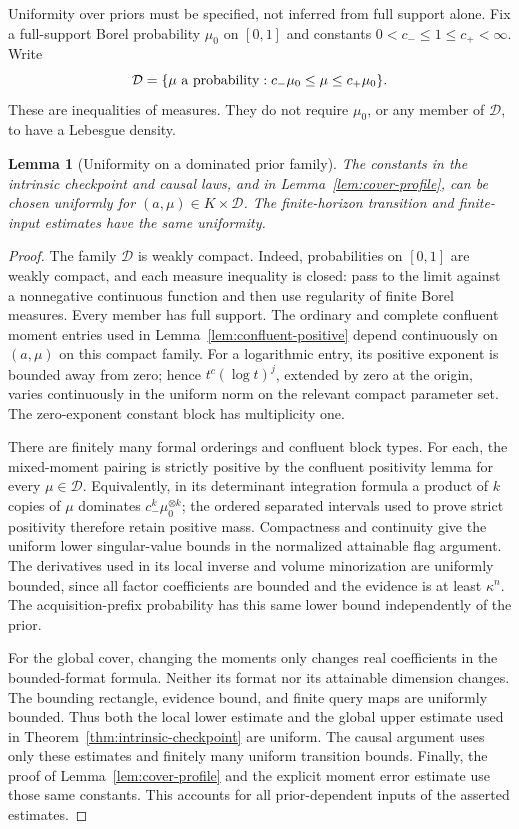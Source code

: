 \documentclass[11pt]{amsart}
\newtheorem{lemma}[theorem]{Lemma}
\theoremstyle{definition}\newtheorem{definition}[theorem]{Definition}
\theoremstyle{remark}\newtheorem{remark}[theorem]{Remark}
\begin{document}
Uniformity over priors must be specified, not inferred from full support
alone. Fix a full-support Borel probability $\mu_0$ on $[0,1]$ and
constants $0<c_-\le1\le c_+<\infty$. Write
\[
 \mathcal D=\{\mu\hbox{ a probability}:c_-\mu_0\le\mu\le c_+\mu_0\}.
\]
These are inequalities of measures. They do not require $\mu_0$, or
any member of $\mathcal D$, to have a Lebesgue density.

\begin{lemma}[Uniformity on a dominated prior family]
\label{lem:prior-envelope}
The constants in the intrinsic checkpoint and causal laws, and in
Lemma~\ref{lem:cover-profile}, can be chosen uniformly for
$(a,\mu)\in K\times\mathcal D$. The finite-horizon transition and
finite-input estimates have the same uniformity.
\end{lemma}
\begin{proof}
The family $\mathcal D$ is weakly compact. Indeed, probabilities on
$[0,1]$ are weakly compact, and each measure inequality is closed:
pass to the limit against a nonnegative continuous function and then
use regularity of finite Borel measures. Every member has full support.
The ordinary and complete confluent moment entries used in
Lemma~\ref{lem:confluent-positive} depend continuously on
$(a,\mu)$ on this compact family. For a logarithmic entry, its positive
exponent is bounded away from zero; hence $t^c(\log t)^j$, extended
by zero at the origin, varies continuously in the uniform norm on
the relevant compact parameter set. The zero-exponent constant block
has multiplicity one.

There are finitely many formal orderings and confluent block types.
For each, the mixed-moment pairing is strictly positive by the
confluent positivity lemma for every $\mu\in\mathcal D$.
Equivalently, in its determinant integration formula a product of
$k$ copies of $\mu$ dominates $c_-^k\mu_0^{\otimes k}$; the ordered
separated intervals used to prove strict positivity therefore retain
positive mass. Compactness and continuity give the uniform lower
singular-value bounds in the normalized attainable flag argument.
The derivatives used in its local inverse and volume minorization
are uniformly bounded, since all factor coefficients are bounded and
the evidence is at least $\kappa^n$. The acquisition-prefix probability
has this same lower bound independently of the prior.

For the global cover, changing the moments only changes real
coefficients in the bounded-format formula. Neither its format nor
its attainable dimension changes. The bounding rectangle, evidence
bound, and finite query maps are uniformly bounded. Thus both the
local lower estimate and the global upper estimate used in
Theorem~\ref{thm:intrinsic-checkpoint} are uniform. The causal argument
uses only these estimates and finitely many uniform transition bounds.
Finally, the proof of Lemma~\ref{lem:cover-profile} and the explicit
moment error estimate use those same constants. This accounts for
all prior-dependent inputs of the asserted estimates.
\end{proof}
\end{document}
